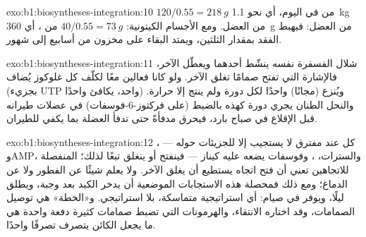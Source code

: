 \begin{solution}{exo:b1:biosyntheses-integration:10}
$120/0.55 = \qty{218}{g}$ من  في اليوم، أي نحو \qty{1.1}{kg}
من العضل. ومع الأجسام الكيتونية: $40/0.55 = \qty{73}{g}$ من
، أي \qty{360}{g} من العضل: فيهبط الفقد بمقدار الثلثين، ويمتد
البقاء على مخزون  من أسابيع إلى شهور.
\end{solution}

\begin{solution}{exo:b1:biosyntheses-integration:11}
شلال الفسفرة نفسه ينشّط أحدهما ويعطّل الآخر، فالإشارة التي تفتح صمامًا
تغلق الآخر. ولو كانا فعالين معًا لكلّف كل غلوكوز يُضاف (بجزيء UTP واحد،
يكافئ  واحدًا) ويُنزع (مجانًا)  واحدًا لكل دورة ولم ينتج إلا
حرارة. والنحل الطنان يجري دورة كهذه بالضبط (على فركتوز-6-فوسفات) في
عضلات طيرانه قبل الإقلاع في صباح بارد، فيحرق  مدفأةً حتى تدفأ
العضلة بما يكفي للطيران.
\end{solution}

\begin{solution}{exo:b1:biosyntheses-integration:12}
كل  عند مفترق لا يستجيب إلا للجزيئات حوله --- ، وAMP،
والسترات، ، وفوسفات يضعه عليه كيناز --- فينفتح أو ينغلق
تبعًا لذلك؛  المنفصلة للاتجاهين تعني أن فتح اتجاه يستطيع أن
يغلق الآخر. ولا  يعلم شيئًا عن الفطور ولا عن الدماغ؛ ومع ذلك
فمحصلة هذه الاستجابات الموضعية أن يدخر الكبد بعد وجبة، ويطلق ليلًا،
ويوفر  في صيام: أي استراتيجية متماسكة، بلا استراتيجي.
و«الخطة» هي توصيل الصمامات، وقد اختاره الانتقاء، والهرمونات التي
تضبط صمامات كثيرة دفعة واحدة هي ما يجعل الكائن يتصرف تصرفًا واحدًا.
\end{solution}

